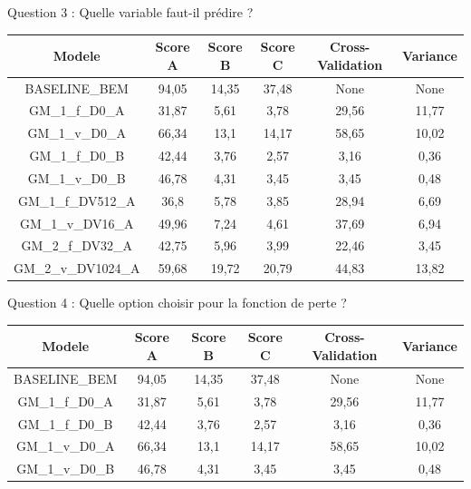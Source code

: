 \documentclass[
11pt,notheorems,hyperref={pdfauthor=whatever}
]{beamer}
\begin{document}
\begin{frame}{Question 3 : Quelle variable faut-il prédire ?}

            \begin{tabular}{|c|c|c|c|c|c|}
                \hline
                \textbf{Modele} & \textbf{Score A} & \textbf{Score B} & \textbf{Score C} & \textbf{Cross-Validation} & \textbf{Variance} \\
                \hline
                BASELINE\_BEM &94,05 & 14,35 & 37,48 & None  & None   \\
                \hline
                GM\_1\_f\_D0\_A & 31,87 & 5,61 & 3,78 & 29,56 & 11,77 \\
                GM\_1\_v\_D0\_A & 66,34 & 13,1 & 14,17 & 58,65 & 10,02 \\
                \hline
                GM\_1\_f\_D0\_B & 42,44 & 3,76 & 2,57 & 3,16 & 0,36 \\
                GM\_1\_v\_D0\_B & 46,78 & 4,31 & 3,45 & 3,45 & 0,48 \\
                \hline
                GM\_1\_f\_DV512\_A & 36,8 & 5,78 & 3,85 & 28,94 & 6,69 \\
                GM\_1\_v\_DV16\_A & 49,96 & 7,24 & 4,61 & 37,69 & 6,94 \\
                \hline
                GM\_2\_f\_DV32\_A & 42,75 & 5,96 & 3,99 & 22,46 & 3,45 \\
                GM\_2\_v\_DV1024\_A & 59,68 & 19,72 & 20,79 & 44,83 & 13,82 \\
                \hline
            \end{tabular}
\end{frame}

\begin{frame}{Question 4 : Quelle option choisir pour la fonction de perte ?}
            \begin{tabular}{|c|c|c|c|c|c|}
                \hline
                \textbf{Modele} & \textbf{Score A} & \textbf{Score B} & \textbf{Score C} & \textbf{Cross-Validation} & \textbf{Variance} \\
                \hline
                BASELINE\_BEM &94,05 & 14,35 & 37,48 & None  & None   \\
                \hline    
                GM\_1\_f\_D0\_A & 31,87 & 5,61 & 3,78 & 29,56 & 11,77 \\
                GM\_1\_f\_D0\_B & 42,44 & 3,76 & 2,57 & 3,16 & 0,36 \\
                \hline
                GM\_1\_v\_D0\_A & 66,34 & 13,1 & 14,17 & 58,65 & 10,02 \\
                GM\_1\_v\_D0\_B & 46,78 & 4,31 & 3,45 & 3,45 & 0,48 \\                
                \hline
            \end{tabular}
\end{frame}
\end{document}

